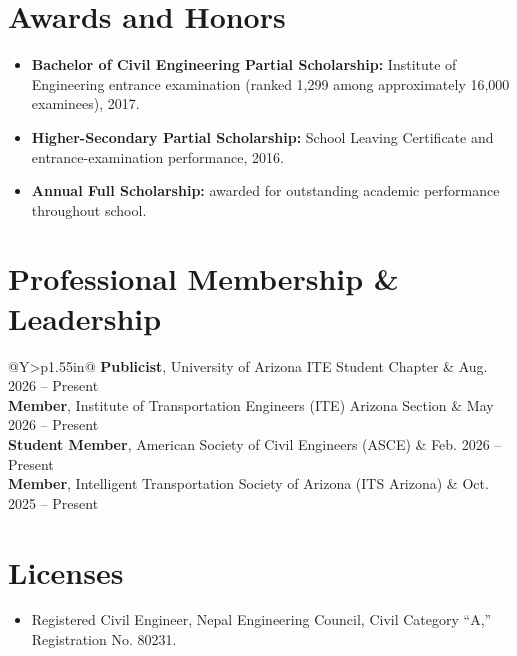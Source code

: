 \documentclass[10pt,letterpaper]{article}
\newcommand{\membershiprow}[3]{%
  \textbf{#1}, #2 & #3 \\[2pt]
}
\newenvironment{cvitems}{%
  \begin{itemize}[
    leftmargin=15pt,
    label=\textbullet,
    labelsep=6pt,
    topsep=2pt,
    itemsep=1.5pt,
    parsep=0pt,
    partopsep=0pt
  ]
}{\end{itemize}}
\begin{document}

\section{Awards and Honors}

\begin{cvitems}
  \item \textbf{Bachelor of Civil Engineering Partial Scholarship:} Institute of Engineering entrance examination (ranked 1,299 among approximately 16,000 examinees), 2017.
  \item \textbf{Higher-Secondary Partial Scholarship:} School Leaving Certificate and entrance-examination performance, 2016.
  \item \textbf{Annual Full Scholarship:} awarded for outstanding academic performance throughout school.
\end{cvitems}

\section{Professional Membership \& Leadership}

\begin{tabularx}{\linewidth}{@{}Y>{\raggedleft\arraybackslash}p{1.55in}@{}}
  \membershiprow
    {Publicist}
    {University of Arizona ITE Student Chapter}
    {Aug. 2026 -- Present}
  \membershiprow
    {Member}
    {Institute of Transportation Engineers (ITE) Arizona Section}
    {May 2026 -- Present}
  \membershiprow
    {Student Member}
    {American Society of Civil Engineers (ASCE)}
    {Feb. 2026 -- Present}
  \membershiprow
    {Member}
    {Intelligent Transportation Society of Arizona (ITS Arizona)}
    {Oct. 2025 -- Present}
\end{tabularx}

\section{Licenses}

\begin{cvitems}
  \item Registered Civil Engineer, Nepal Engineering Council, Civil Category ``A,'' Registration No. 80231.
\end{cvitems}
\end{document}
